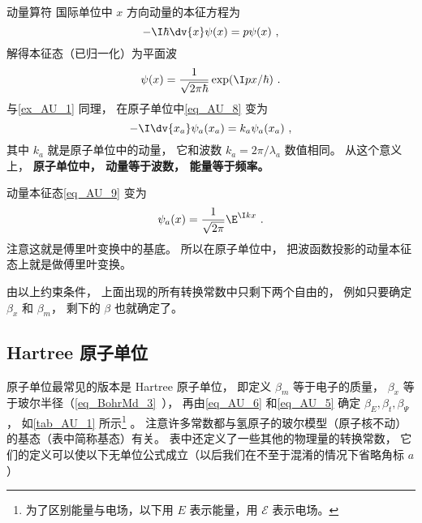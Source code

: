 \begin{example}{动量算符}\label{ex_AU_2}
国际单位中 $x$ 方向动量的本征方程为
\begin{equation}\label{eq_AU_8}
-\I\hbar \dv{x} \psi(x) = p \psi(x)~,
\end{equation}
解得本征态（已归一化）为平面波
\begin{equation}\label{eq_AU_9}
\psi(x) = \frac{1}{\sqrt{2\pi\hbar}}\exp(\I p x/\hbar)~.
\end{equation}
与\autoref{ex_AU_1} 同理， 在原子单位中\autoref{eq_AU_8} 变为
\begin{equation}
-\I\dv{x_a} \psi_a(x_a) = k_a \psi_a(x_a)~,
\end{equation}
其中 $k_a$ 就是原子单位中的动量， 它和波数 $k_a = 2\pi/\lambda_a$ 数值相同。 从这个意义上， \textbf{原子单位中， 动量等于波数， 能量等于频率。}

动量本征态\autoref{eq_AU_9} 变为
\begin{equation}
\psi_a(x) = \frac{1}{\sqrt{2\pi}}\E^{\I kx}~.
\end{equation}
注意这就是傅里叶变换中的基底。 所以在原子单位中， 把波函数投影的动量本征态上就是做傅里叶变换。
\end{example}

由以上约束条件， 上面出现的所有转换常数中只剩下两个自由的， 例如只要确定 $\beta_x$ 和 $\beta_m$， 剩下的 $\beta$ 也就确定了。

\subsection{Hartree 原子单位}
原子单位最常见的版本是 Hartree 原子单位， 即定义 $\beta_m$ 等于电子的质量， $\beta_x$ 等于玻尔半径（\autoref{eq_BohrMd_3}~）， 再由\autoref{eq_AU_6} 和\autoref{eq_AU_5} 确定 $\beta_E, \beta_t, \beta_\Psi$， 如\autoref{tab_AU_1} 所示\footnote{为了区别能量与电场，以下用 $E$ 表示能量，用 $\mathcal{E}$ 表示电场。} 。 注意许多常数都与氢原子的玻尔模型（原子核不动）的基态（表中简称基态）有关。 表中还定义了一些其他的物理量的转换常数， 它们的定义可以使以下无单位公式成立（以后我们在不至于混淆的情况下省略角标 $a$）

